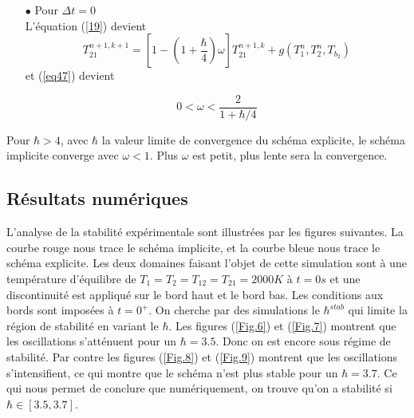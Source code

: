 \documentclass[11pt,a4paper]{scrartcl}%
\begin{document}
\begin{itemize}
		\item [$\bullet$]  Pour $\Delta t = 0$\\
		L'équation (\ref{19}) devient
		\begin{equation}
		T_{21}^{n+1,k+1} = \left[1- \left(1+ \frac{\hbar}{4}\right)\omega \right]T_{21}^{n+1,k} + g(T_1^n, T_2^n, T_{b_2}) 
		\end{equation} 
		et (\ref{eq47}) devient
		
		\begin{equation}
		0 < \omega < \frac{2}{1+\hbar/4}
		\end{equation}
	\end{itemize}
	Pour $\hbar > 4$, avec $\hbar$ la valeur limite de convergence du schéma explicite, le schéma implicite converge avec $\omega < 1$. Plus $\omega$ est petit, plus lente sera la convergence. 
	\subsection{Résultats numériques}
	L'analyse de la stabilité expérimentale sont illustrées par les figures suivantes. La courbe rouge nous trace le schéma implicite, et la courbe bleue nous trace le schéma explicite.  Les deux domaines faisant l'objet de cette simulation sont à une température d'équilibre de $T_1 = T_2 = T_{12} = T_{21} = 2000 K$ à $t=0s$ et une discontinuité est appliqué sur le bord haut et le bord bas. Les conditions aux bords sont imposées à $t=0^+$. On cherche par des simulations le $\hbar^{stab}$ qui limite la région de stabilité en variant le $\hbar$. Les figures (\ref{Fig.6}) et (\ref{Fig.7}) montrent que les oscillations s'atténuent pour un $\hbar = 3.5$. Donc on est encore sous régime de stabilité. Par contre les figures (\ref{Fig.8}) et (\ref{Fig.9}) montrent que les oscillations s'intensifient, ce qui montre que le schéma n'est plus stable pour un $\hbar = 3.7$. Ce qui nous permet de conclure que numériquement, on trouve qu'on a stabilité si $\hbar\in[3.5,3.7]$. \\
	\\	
	
\end{document}

